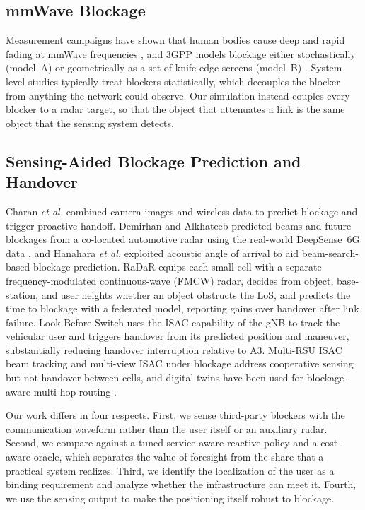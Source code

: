\documentclass[journal]{IEEEtran}
\begin{document}
\subsection{mmWave Blockage}
Measurement campaigns have shown that human bodies cause deep and rapid
fading at mmWave frequencies \cite{maccartney2017blockage}, and 3GPP
models blockage either stochastically (model~A) or geometrically as a
set of knife-edge screens (model~B) \cite{3gpp38901}. System-level
studies typically treat blockers statistically, which decouples the
blocker from anything the network could observe. Our simulation instead
couples every blocker to a radar target, so that the object that
attenuates a link is the same object that the sensing system detects.

\subsection{Sensing-Aided Blockage Prediction and Handover}
Charan \emph{et al.} \cite{charan2021vision} combined camera images and
wireless data to predict blockage and trigger proactive handoff.
Demirhan and Alkhateeb \cite{demirhan2022radar,demirhan2022radarblockage}
predicted beams and future blockages from a co-located automotive radar
using the real-world DeepSense~6G data \cite{alkhateeb2023deepsense}, and
Hanahara \emph{et al.} \cite{hanahara2024acoustic} exploited acoustic
angle of arrival to aid beam-search-based blockage prediction. RaDaR
\cite{alquraan2023radar} equips each small cell with a separate
frequency-modulated continuous-wave (FMCW) radar, decides from object,
base-station, and user heights whether an object obstructs the LoS, and
predicts the time to blockage with a federated model, reporting gains
over handover after link failure. Look Before Switch
\cite{li2025lookbefore} uses the ISAC capability of the gNB to track the
vehicular user and triggers handover from its predicted position and
maneuver, substantially reducing handover interruption relative to A3.
Multi-RSU ISAC beam tracking \cite{xu2025isacbeam} and multi-view ISAC
under blockage \cite{cui2025multiview} address cooperative sensing but
not handover between cells, and digital twins have been used for
blockage-aware multi-hop routing \cite{roongpraiwan2025dt}.

Our work differs in four respects. First, we sense third-party blockers
with the communication waveform rather than the user itself or an
auxiliary radar. Second, we compare against a tuned service-aware
reactive policy and a cost-aware oracle, which separates the value of
foresight from the share that a practical system realizes. Third, we
identify the localization of the user as a binding requirement and
analyze whether the infrastructure can meet it. Fourth,
\textcolor{propcol}{we use the sensing output to make the positioning
itself robust to blockage}.
\end{document}
